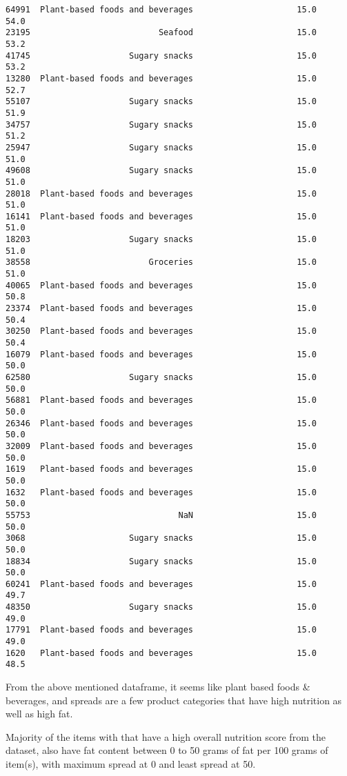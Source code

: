 \documentclass[11pt]{article}
\makeatletter
\newcommand{\boxspacing}{\kern\kvtcb@left@rule\kern\kvtcb@boxsep}
\newcommand{\prompt}[4]{
        \ttfamily\llap{{\color{#2}[#3]:\hspace{3pt}#4}}\vspace{-\baselineskip}
    }
\makeatother
\begin{document}
\begin{tcolorbox}[breakable, size=fbox, boxrule=.5pt, pad at break*=1mm, opacityfill=0]
\begin{Verbatim}[commandchars=\\\{\}]
64991  Plant-based foods and beverages                     15.0      54.0
23195                          Seafood                     15.0      53.2
41745                    Sugary snacks                     15.0      53.2
13280  Plant-based foods and beverages                     15.0      52.7
55107                    Sugary snacks                     15.0      51.9
34757                    Sugary snacks                     15.0      51.2
25947                    Sugary snacks                     15.0      51.0
49608                    Sugary snacks                     15.0      51.0
28018  Plant-based foods and beverages                     15.0      51.0
16141  Plant-based foods and beverages                     15.0      51.0
18203                    Sugary snacks                     15.0      51.0
38558                        Groceries                     15.0      51.0
40065  Plant-based foods and beverages                     15.0      50.8
23374  Plant-based foods and beverages                     15.0      50.4
30250  Plant-based foods and beverages                     15.0      50.4
16079  Plant-based foods and beverages                     15.0      50.0
62580                    Sugary snacks                     15.0      50.0
56881  Plant-based foods and beverages                     15.0      50.0
26346  Plant-based foods and beverages                     15.0      50.0
32009  Plant-based foods and beverages                     15.0      50.0
1619   Plant-based foods and beverages                     15.0      50.0
1632   Plant-based foods and beverages                     15.0      50.0
55753                              NaN                     15.0      50.0
3068                     Sugary snacks                     15.0      50.0
18834                    Sugary snacks                     15.0      50.0
60241  Plant-based foods and beverages                     15.0      49.7
48350                    Sugary snacks                     15.0      49.0
17791  Plant-based foods and beverages                     15.0      49.0
1620   Plant-based foods and beverages                     15.0      48.5
\end{Verbatim}
\end{tcolorbox}
        
    From the above mentioned dataframe, it seems like plant based foods \&
beverages, and spreads are a few product categories that have high
nutrition as well as high fat.

Majority of the items with that have a high overall nutrition score from
the dataset, also have fat content between 0 to 50 grams of fat per 100
grams of item(s), with maximum spread at 0 and least spread at 50.

    \begin{tcolorbox}[breakable, size=fbox, boxrule=1pt, pad at break*=1mm,colback=cellbackground, colframe=cellborder]
\prompt{In}{incolor}{ }{\boxspacing}
\begin{Verbatim}[commandchars=\\\{\}]

\end{Verbatim}
\end{tcolorbox}


    
    
    
\end{document}
